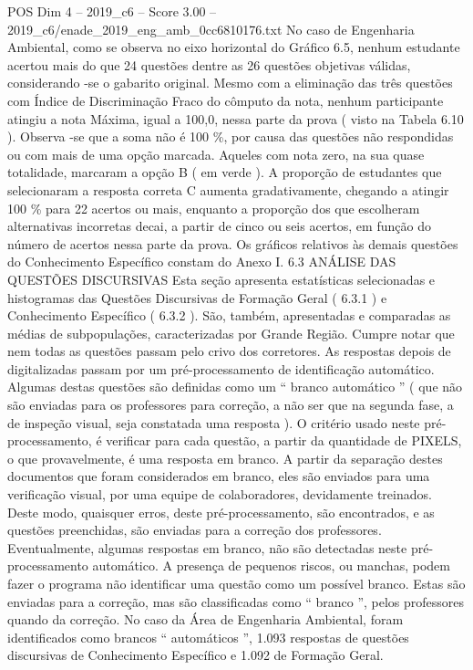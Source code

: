\begin{textsample}{POS Dim 4 – 2019\_c6 – Score 3.00 – 2019\_c6/enade\_2019\_eng\_amb\_0cc6810176.txt}
No caso de Engenharia Ambiental, como se observa no eixo horizontal do Gráfico 6.5, nenhum estudante acertou mais do que 24 questões dentre as 26 questões objetivas válidas, considerando -se o gabarito original.
Mesmo com a eliminação das três questões com Índice de Discriminação Fraco do cômputo da nota, nenhum participante atingiu a nota Máxima, igual a 100,0, nessa parte da prova ( visto na Tabela 6.10 ).
Observa -se que a soma não é 100 \%, por causa das questões não respondidas ou com mais de uma opção marcada.
Aqueles com nota zero, na sua quase totalidade, marcaram a opção B ( em verde ).
A proporção de estudantes que selecionaram a resposta correta C aumenta gradativamente, chegando a atingir 100 \% para 22 acertos ou mais, enquanto a proporção dos que escolheram alternativas incorretas decai, a partir de cinco ou seis acertos, em função do número de acertos nessa parte da prova.
Os gráficos relativos às demais questões do Conhecimento Específico constam do Anexo I. 6.3 ANÁLISE DAS QUESTÕES DISCURSIVAS Esta seção apresenta estatísticas selecionadas e histogramas das Questões Discursivas de Formação Geral ( 6.3.1 ) e Conhecimento Específico ( 6.3.2 ).
São, também, apresentadas e comparadas as médias de subpopulações, caracterizadas por Grande Região.
Cumpre notar que nem todas as questões passam pelo crivo dos corretores.
As respostas depois de digitalizadas passam por um pré-processamento de identificação automático.
Algumas destas questões são definidas como um “ branco automático ” ( que não são enviadas para os professores para correção, a não ser que na segunda fase, a de inspeção visual, seja constatada uma resposta ).
O critério usado neste pré-processamento, é verificar para cada questão, a partir da quantidade de PIXELS, o que provavelmente, é uma resposta em branco.
A partir da separação destes documentos que foram considerados em branco, eles são enviados para uma verificação visual, por uma equipe de colaboradores, devidamente treinados.
Deste modo, quaisquer erros, deste pré-processamento, são encontrados, e as questões preenchidas, são enviadas para a correção dos professores.
Eventualmente, algumas respostas em branco, não são detectadas neste pré-processamento automático.
A presença de pequenos riscos, ou manchas, podem fazer o programa não identificar uma questão como um possível branco.
Estas são enviadas para a correção, mas são classificadas como “ branco ”, pelos professores quando da correção.
No caso da Área de Engenharia Ambiental, foram identificados como brancos “ automáticos ”, 1.093 respostas de questões discursivas de Conhecimento Específico e 1.092 de Formação Geral.

\end{textsample}
